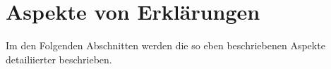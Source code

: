 \section{Aspekte von Erklärungen}
\label{sec:model_explanation_aspects}

Im den Folgenden Abschnitten werden die so eben beschriebenen Aspekte detailiierter beschrieben.







